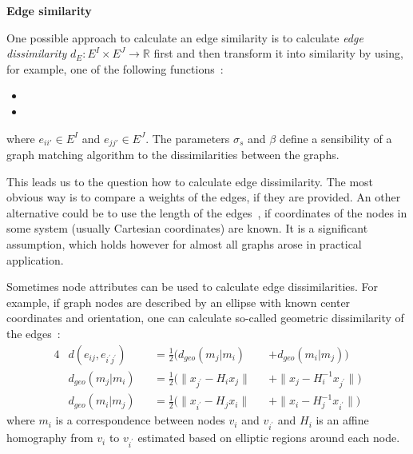 \textbf{Edge similarity}

One possible approach to calculate an edge similarity is to calculate \emph{edge dissimilarity} $d_E:E^I\times E^J\rightarrow\mathbb{R}$ first and then transform it into similarity by using, for example, one of the following functions~\cite{ Cho2009_AgglClustering, Cho2010_RRWM,Cho2012_ProgressiveGM,Cho2014_Haystack}:
\begin{itemize}
	\item {}
	\item {}
\end{itemize}
where $e_{ii\prime}\in E^I$ and $e_{jj\prime}\in E^J$. The parameters $\sigma_s$ and $\beta$ define a sensibility of a graph matching algorithm to the dissimilarities between the graphs.

This leads us to the question how to calculate edge dissimilarity. The most obvious way is to compare a weights of the edges, if they are provided. An other alternative could be to use the length of the edges~\cite{Cho2009_AgglClustering, Cho2010_RRWM,Cho2012_ProgressiveGM,Cho2014_Haystack}, if coordinates of the nodes in some system (usually Cartesian coordinates) are known. It is a significant assumption, which holds however for almost all graphs arose in practical application.

Sometimes node attributes can be used to calculate edge dissimilarities. For example, if graph nodes are described by an ellipse with known center coordinates and orientation, one can calculate so-called geometric dissimilarity of the edges~\cite{Cho2009_AgglClustering,Cho2012_ProgressiveGM}:
\begin{alignat}{4}\label{eq:geomDiss}
& d(e_{ij},e_{i^\prime j^\prime}) && =\frac{1}{2}(d_{geo}(m_j|m_i) && +d_{geo}(m_i|m_j)) \\
& d_{geo}(m_j|m_i) && =\frac{1}{2}(\|x_{j^\prime}-H_{i}x_j\| && + \|x_{j}-H^{-1}_ix_{j^\prime}\|) \\
& d_{geo}(m_i|m_j) && =\frac{1}{2}(\|x_{i^\prime}-H_{j}x_i\| && + \|x_{i}-H^{-1}_{j}x_{i^\prime}\|) 
\end{alignat}
where $m_i$ is a correspondence between nodes $v_i$ and $v_{i^\prime}$ and $H_i$ is an affine homography from $v_i$ to $v_{i^\prime}$ estimated based on elliptic regions around each node.

